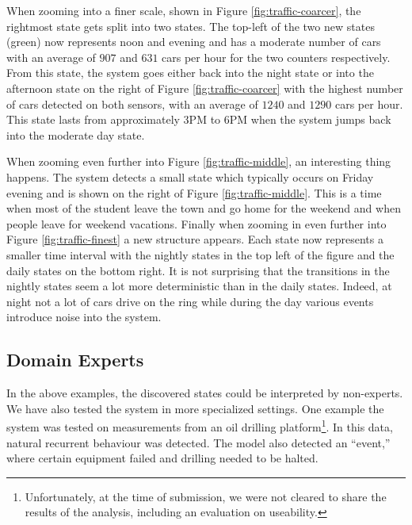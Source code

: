 When zooming into a finer scale, shown in Figure \ref{fig:traffic-coarcer}, the rightmost state gets split into two states. The top-left of the two new states (green) now represents noon and evening and has a moderate number of cars with an average of $907$ and $631$ cars per hour for the two counters respectively. From this state, the system goes either back into the night state or into the afternoon state on the right of Figure \ref{fig:traffic-coarcer} with the highest number of cars detected on both sensors, with an average of $1240$ and $1290$ cars per hour. This state lasts from approximately $3$PM to $6$PM when the system jumps back into the moderate day state.

When zooming even further into Figure \ref{fig:traffic-middle}, an interesting thing happens. The system detects a small state which typically occurs on Friday evening and is shown on the right of Figure \ref{fig:traffic-middle}. This is a time when most of the student leave the town and go home for the weekend and when people leave for weekend vacations.
Finally when zooming in even further into Figure \ref{fig:traffic-finest} a new structure appears. Each state now represents a smaller time interval with the nightly states in the top left of the figure and the daily states on the bottom right. It is not surprising that the transitions in the nightly states seem a lot more deterministic than in the daily states. Indeed, at night not a lot of cars drive on the ring while during the day various events introduce noise into the system.


\subsection{Domain Experts}
In the above examples, the discovered states could be interpreted by non-experts. We have also tested the system in more specialized settings. One example the system was tested on measurements from an oil drilling platform\footnote{Unfortunately, at the time of submission, we were not cleared to share the results of the analysis, including an evaluation on useability.}. In this data, natural recurrent behaviour was detected.  The model also detected an ``event,'' where certain equipment failed and drilling needed to be halted.  


